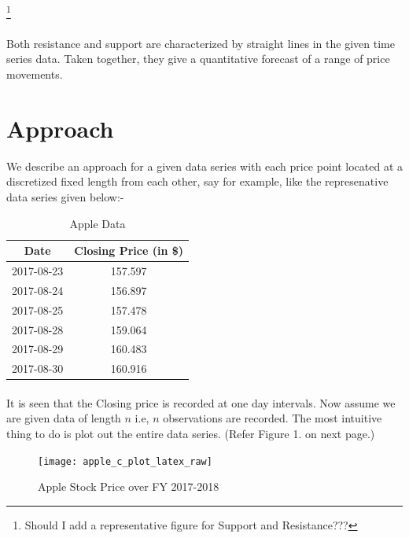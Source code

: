\documentclass[letterpaper, 12pt] {article}
\begin{document}
	\footnote{Should I add a representative figure for Support and Resistance???}
	
	
	\paragraph{} Both resistance and support are characterized by straight lines in the given time series data. Taken together, they give a quantitative forecast of a range of price movements.  

	\section{Approach}
	We describe an approach for a given data series with each price point located at a discretized fixed length from each other, say for example, like the represenative data series given below:-

	
	\begin{table}[h!]
		\centering
		\caption {Apple Data} \label{tab:} 
		
		\begin{tabular}{|c|c|}
			\hline
			\rowcolor[HTML]{C0C0C0} 
			{\color[HTML]{9A0000} { \textbf{Date}}} & {\color[HTML]{9A0000} {\textbf{Closing Price (in \$)}}} \\ \hline
			2017-08-23                                 & 157.597                                                     \\ \hline
			2017-08-24                                 & 156.897                                                     \\ \hline
			2017-08-25                                 & 157.478                                                     \\ \hline
			2017-08-28                                 & 159.064                                                     \\ \hline
			2017-08-29                                 & 160.483                                                     \\ \hline
			2017-08-30                                 & 160.916                                                     \\ \hline
		\end{tabular}
	\end{table}
	
	\paragraph{}
	It is seen that the Closing price is recorded at one day intervals. Now assume we are given data of length $n$ i.e, $n$ observations are recorded. The most intuitive thing to do is plot out the entire data series. (Refer Figure 1. on next page.)
	\begin{figure}[h!]
		\centering
		\texttt{[image: apple\_c\_plot\_latex\_raw]}
		\caption{Apple Stock Price over FY 2017-2018}
		\label{Figure 1}
		
	\end{figure}
	
\end{document}
